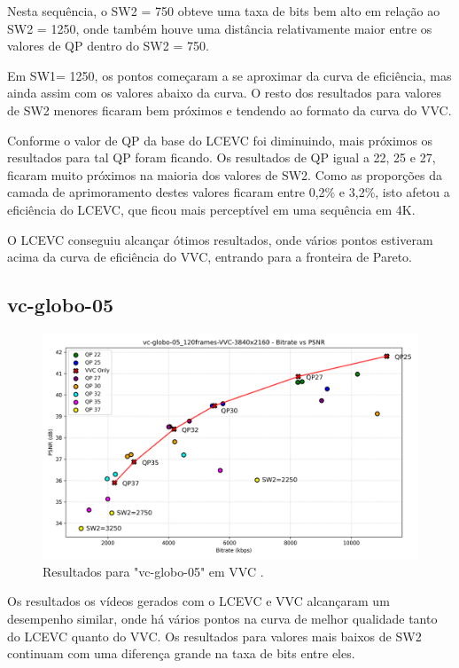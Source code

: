 Nesta sequência, o SW2 = 750 obteve uma taxa de bits bem alto em relação ao
SW2 = 1250, onde também houve uma distância relativamente maior entre os valores de
QP dentro do SW2 = 750.

Em SW1= 1250, os pontos começaram a se aproximar da curva de eficiência, mas ainda 
assim com os valores abaixo da curva. O resto dos resultados para valores de SW2 menores
ficaram bem próximos e tendendo ao formato da curva do \acrshort{VVC}.

Conforme o valor de QP da base do \acrshort{LCEVC} foi diminuindo, mais próximos os 
resultados para tal QP foram ficando. Os resultados de QP igual a 22, 25 e 27, ficaram
muito próximos na maioria dos valores de SW2. Como as proporções da camada de aprimoramento
destes valores ficaram entre 0,2\% e 3,2\%, isto afetou a eficiência do \acrshort{LCEVC}, que
ficou mais perceptível em uma sequência em 4K.

O \acrshort{LCEVC} conseguiu alcançar ótimos resultados, onde vários pontos estiveram
acima da curva de eficiência do \acrshort{VVC}, entrando para a fronteira de Pareto.

\newpage

\subsection{vc-globo-05}

\begin{figure}[h]
    \centering
    \includegraphics[width=1.0\textwidth]{img/vc-globo-05_120frames-VVC.png}
    \caption{Resultados para "vc-globo-05" em \acrshort{VVC} \cite{globo_video_uhd}.}
    \label{fig:vc-globo-05-VVC}
\end{figure}

Os resultados os vídeos gerados com o \acrshort{LCEVC} e \acrshort{VVC} alcançaram
um desempenho similar, onde há vários pontos na curva de melhor qualidade tanto 
do \acrshort{LCEVC} quanto do \acrshort{VVC}. Os resultados para valores mais baixos
de SW2 continuam com uma diferença grande na taxa de bits entre eles.

